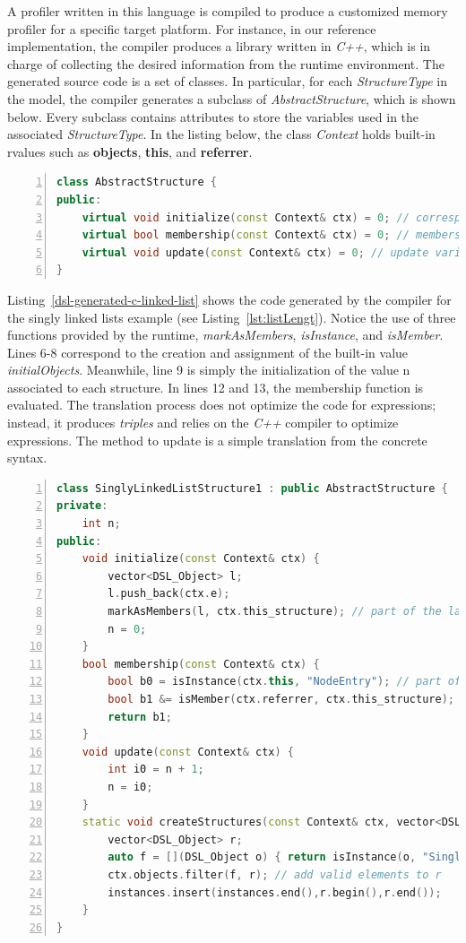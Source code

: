 A profiler written in this language is compiled to produce a customized memory profiler for a specific target platform.
For instance, in our reference implementation, the compiler produces a library written in \textit{C++}, which is in charge of collecting the desired information from the runtime environment.
The generated source code is a set of classes.
In particular, for each \textit{StructureType} in the model, the compiler generates a subclass of \textit{AbstractStructure},  which is shown below.
Every subclass contains attributes to store the variables used in the associated \textit{StructureType}.
In the listing below, the class \textit{Context} holds built-in rvalues such as \textbf{objects}, \textbf{this}, and \textbf{referrer}.
\begin{lstlisting}[language=C++, frame=L,
numbers=left,
numberstyle=\color{black}\scriptsize,xleftmargin=2\parindent]
class AbstractStructure {
public:
	virtual void initialize(const Context& ctx) = 0; // correspond to constructor
	virtual bool membership(const Context& ctx) = 0; // membership function
	virtual void update(const Context& ctx) = 0; // update variables
}
\end{lstlisting}

Listing~\ref{dsl-generated-c-linked-list} shows the code generated by the compiler for the singly linked lists example (see Listing~\ref{lst:listLengt}).
Notice the use of three functions provided by the runtime, \textit{markAsMembers}, \textit{isInstance}, and \textit{isMember}. 
Lines 6-8 correspond to the creation and assignment of the built-in value \textit{initialObjects}.
Meanwhile, line 9 is simply the initialization of the value n associated to each structure.
In lines 12 and 13, the membership function is evaluated. 
The translation process does not optimize the code for expressions; instead, it produces \textit{triples} and relies on the \textit{C++} compiler to optimize expressions.
The method to update is a simple translation from the concrete syntax. 

\begin{lstlisting}[language=C++, frame=L,
numbers=left,
numberstyle=\color{black}\scriptsize,xleftmargin=2\parindent, label=dsl-generated-c-linked-list,
caption={To represent a structure type, we declare a subclass of AbstractStructure.}]
class SinglyLinkedListStructure1 : public AbstractStructure {
private:
	int n;
public:
	void initialize(const Context& ctx) {
		vector<DSL_Object> l;
		l.push_back(ctx.e);
		markAsMembers(l, ctx.this_structure); // part of the language runtime support
		n = 0;
	}
	bool membership(const Context& ctx) {
		bool b0 = isInstance(ctx.this, "NodeEntry"); // part of the language runtime support
		bool b1 &= isMember(ctx.referrer, ctx.this_structure); // part of the runtime support
		return b1;
	}
	void update(const Context& ctx) {
		int i0 = n + 1;
		n = i0;
	}
	static void createStructures(const Context& ctx, vector<DSL_Object>& instances) {
		vector<DSL_Object> r;
		auto f = [](DSL_Object o) { return isInstance(o, "SinglyLinkedList")};
		ctx.objects.filter(f, r); // add valid elements to r
		instances.insert(instances.end(),r.begin(),r.end()); 
	}
}
\end{lstlisting}

